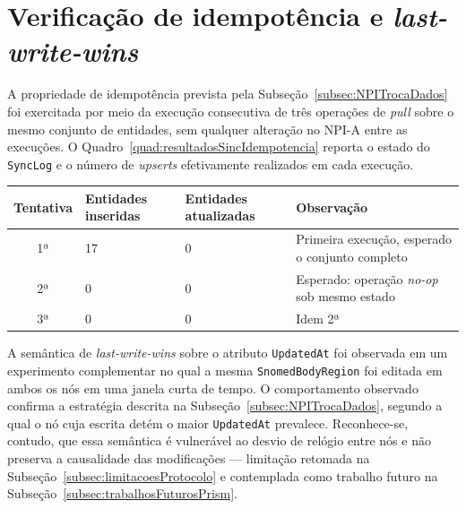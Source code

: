 \section{Verificação de idempotência e \textit{last-write-wins}}\label{sec:resultadosSincIdempotencia}

A propriedade de idempotência prevista pela Subseção~\ref{subsec:NPITrocaDados} foi exercitada por meio da execução consecutiva de três operações de \textit{pull} sobre o mesmo conjunto de entidades, sem qualquer alteração no NPI-A entre as execuções. O Quadro~\ref{quad:resultadosSincIdempotencia} reporta o estado do \texttt{SyncLog} e o número de \textit{upserts} efetivamente realizados em cada execução.

\begin{tabframed}[htb]
\caption{Idempotência sob retransmissão: estado do \texttt{SyncLog} ao longo de três execuções consecutivas.}
\label{quad:resultadosSincIdempotencia}
\begin{tabular}{|c|p{}|p{}|p{}|}
\hline
\textbf{Tentativa} & \textbf{Entidades inseridas} & \textbf{Entidades atualizadas} & \textbf{Observação} \\ \hline
1ª & 17 & 0 & Primeira execução, esperado o conjunto completo \\ \hline
2ª & 0 & 0 & Esperado: operação \textit{no-op} sob mesmo estado \\ \hline
3ª & 0 & 0 & Idem 2ª \\ \hline
\end{tabular}
\end{tabframed}

A semântica de \textit{last-write-wins} sobre o atributo \texttt{UpdatedAt} foi observada em um experimento complementar no qual a mesma \texttt{SnomedBodyRegion} foi editada em ambos os nós em uma janela curta de tempo. O comportamento observado confirma a estratégia descrita na Subseção~\ref{subsec:NPITrocaDados}, segundo a qual o nó cuja escrita detém o maior \texttt{UpdatedAt} prevalece. Reconhece-se, contudo, que essa semântica é vulnerável ao desvio de relógio entre nós e não preserva a causalidade das modificações --- limitação retomada na Subseção~\ref{subsec:limitacoesProtocolo} e contemplada como trabalho futuro na Subseção~\ref{subsec:trabalhosFuturosPrism}.

